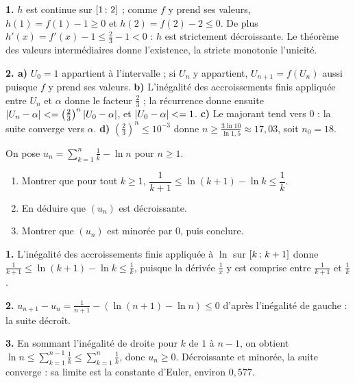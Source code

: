 \begin{corrige}
\textbf{1.} $h$ est continue sur $\left[1\,;\,2\right]$ ; comme $f$ y prend ses
valeurs, $h(1) = f(1)-1 \geq 0$ et $h(2) = f(2)-2 \leq 0$. De plus
$h'(x) = f'(x)-1 \leq \frac23-1<0$ : $h$ est strictement décroissante. Le
théorème des valeurs intermédiaires donne l'existence, la stricte monotonie
l'unicité.

\textbf{2. a)} $U_{0} = 1$ appartient à l'intervalle ; si $U_{n}$ y
appartient, $U_{n+1} = f(U_{n})$ aussi puisque $f$ y prend ses valeurs.
\textbf{b)} L'inégalité des accroissements finis appliquée entre $U_{n}$ et
$\alpha$ donne le facteur $\frac23$ ; la récurrence donne ensuite
$\left|U_{n}-\alpha\right| <= \left(\frac23\right)^{n}\left|U_{0}-\alpha\right|$, et
$\left|U_{0}-\alpha\right| <= 1$.
\textbf{c)} Le majorant tend vers $0$ : la suite converge vers $\alpha$.
\textbf{d)} $\left(\frac23\right)^{n} \leq 10^{-3}$ donne
$n \geq \frac{3\ln10}{\ln1{,}5} \approx 17{,}03$, soit $n_{0} = 18$.
\end{corrige}

\begin{concours}
On pose $u_{n} = \displaystyle\sum_{k=1}^{n}\frac{1}{k}-\ln n$ pour
$n \geq 1$.

\begin{enumerate}[label=\textbf{\arabic*.}, leftmargin=*, itemsep=0.25em]
  \item Montrer que pour tout $k \geq 1$,
        $\dfrac{1}{k+1} \leq \ln(k+1)-\ln k \leq \dfrac{1}{k}$.
  \item En déduire que $(u_{n})$ est décroissante.
  \item Montrer que $(u_{n})$ est minorée par $0$, puis conclure.
\end{enumerate}
\end{concours}

\begin{corrige}
\textbf{1.} L'inégalité des accroissements finis appliquée à $\ln$ sur
$\left[k\,;\,k+1\right]$ donne
$\frac{1}{k+1} \leq \ln(k+1)-\ln k \leq \frac1k$, puisque la dérivée
$\frac1x$ y est comprise entre $\frac{1}{k+1}$ et $\frac1k$.

\textbf{2.} $u_{n+1}-u_{n} = \frac{1}{n+1}-\left(\ln(n+1)-\ln n\right)
\leq 0$ d'après l'inégalité de gauche : la suite décroît.

\textbf{3.} En sommant l'inégalité de droite pour $k$ de $1$ à $n-1$, on
obtient $\ln n \leq \sum_{k=1}^{n-1}\frac1k \leq \sum_{k=1}^{n}\frac1k$, donc
$u_{n} \geq 0$. Décroissante et minorée, la suite converge : sa limite est la
constante d'Euler, environ $0{,}577$.
\end{corrige}


